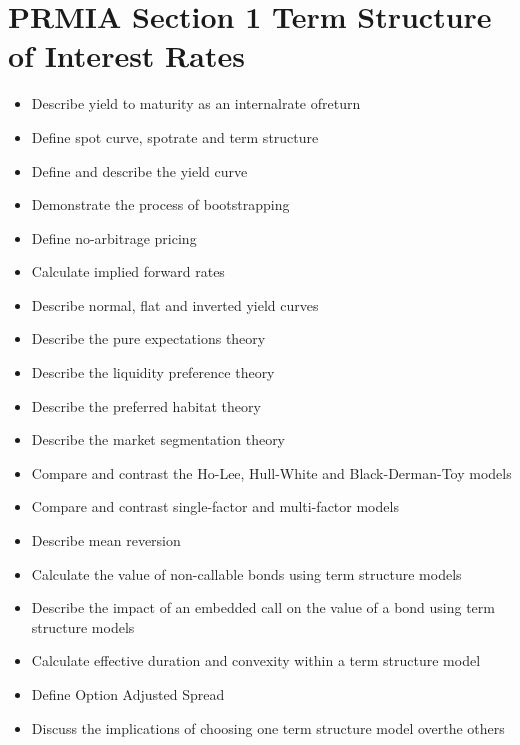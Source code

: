 \documentclass[]{article}
\begin{document}
\section{PRMIA Section 1 Term Structure of Interest Rates}


\begin{itemize}
\item Describe yield to maturity as an internalrate ofreturn
\item Define spot curve, spotrate and term structure
\item Define and describe the yield curve
\item Demonstrate the process of bootstrapping
\item Define no-arbitrage pricing
\item Calculate implied forward rates
\item Describe normal, flat and inverted yield curves
\item Describe the pure expectations theory
\item Describe the liquidity preference theory
\item Describe the preferred habitat theory
\item Describe the market segmentation theory
\item Compare and contrast the Ho-Lee, Hull-White and Black-Derman-Toy models
\item Compare and contrast single-factor and multi-factor models
\item Describe mean reversion
\item Calculate the value of non-callable bonds using term structure models
\item Describe the impact of an embedded call on the value of a bond using term
structure models
\item Calculate effective duration and convexity within a term structure model
\item Define Option Adjusted Spread
\item Discuss the implications of choosing one term structure model
overthe others
\end{itemize}
\end{document}
